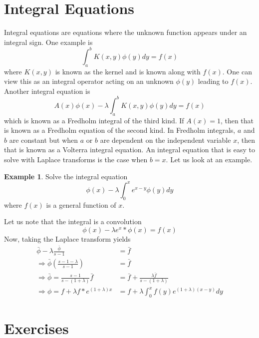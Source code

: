 \documentclass{report}
\theoremstyle{definition}
\newtheorem{example}[theorem]{Example}
\theoremstyle{remark}
\begin{document}
\section{Integral Equations}
Integral equations are equations where the unknown function appears under an integral sign. One example is 
\begin{equation*}
    \int^b_aK(x,y)\phi(y)dy=f(x)
\end{equation*}
where $K(x,y)$ is known as the kernel and is known along with $f(x)$. One can view this as an integral operator acting on an unknown $\phi(y)$ leading to $f(x)$. Another integral equation is 
\begin{equation*}
    A(x)\phi(x)-\lambda\int^b_aK(x,y)\phi(y)dy = f(x) 
\end{equation*}
which is known as a Fredholm integral of the third kind. If $A(x)=1$, then that is known as a Fredholm equation of the second kind. In Fredholm integrals, $a$ and $b$ are constant but when $a$ or $b$ are dependent on the independent variable $x$, then that is known as a Volterra integral equation. An integral equation that is easy to solve with Laplace transforms is the case when $b=x$. Let us look at an example.
\begin{example}
    Solve the integral equation 
    \begin{equation*}
        \phi(x)-\lambda \int^x_0e^{x-y}\phi(y)dy
    \end{equation*}
    where $f(x)$ is a general function of $x$.
\end{example}
Let us note that the integral is a convolution 
\begin{equation*}
    \phi(x)-\lambda e^x*\phi(x)=f(x)
\end{equation*}
Now, taking the Laplace transform yields 
\begin{equation*}
    \begin{split}
        \bar \phi - \lambda\frac{\bar \phi}{s-1} &= \bar f \\
        \Rightarrow \bar \phi\left( \frac{s-1-\lambda}{s-1}\right) &=\bar f \\
        \Rightarrow\bar \phi = \frac{s-1}{s-(1+\lambda)}\bar f &=\bar f + \frac{\lambda \bar f}{s-(1+\lambda)} \\
        \Rightarrow \phi = f+\lambda f*e^{(1+\lambda)x}&=f+\lambda\int^x_0f(y)e^{(1+\lambda)(x-y)}dy
    \end{split}
\end{equation*}

\section{Exercises}
\end{document}
